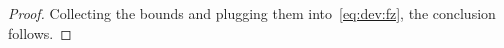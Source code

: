 \documentclass[11pt, a4paper]{article}
\newcommand{\mbf}{\mathbf}
\newcommand{\eps}{\epsilon}
\renewcommand{\l}{\left}
\renewcommand{\r}{\right}
\newcommand{\tr}[0]{\mathsf{tr}}
\newcommand{\p}{\mathsf{P}}
\newcommand{\R}{\mathbb{R}}
\theoremstyle{definition}
\theoremstyle{definition}
\theoremstyle{definition}
\newtheorem{lem}[thm]{Lemma}
\theoremstyle{definition}
\theoremstyle{definition}
\theoremstyle{remark}
\theoremstyle{definition}
\theoremstyle{definition}
\theoremstyle{definition}
\begin{document}
\begin{proof}

Collecting the bounds and plugging them into~\eqref{eq:dev:fz}, the conclusion follows.
\end{proof}


\end{document}
